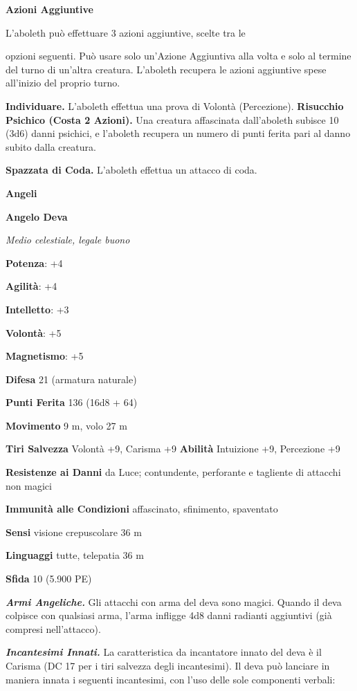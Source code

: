 \begin{multicols}{2}
\textbf{Azioni Aggiuntive}

L'aboleth può effettuare 3 azioni aggiuntive, scelte tra le

opzioni seguenti. Può usare solo un'Azione Aggiuntiva alla volta e
solo al termine del turno di un'altra creatura. L'aboleth recupera le
azioni aggiuntive spese all'inizio del proprio turno.

\textbf{Individuare.} L'aboleth effettua una prova di Volontà
(Percezione). \textbf{Risucchio Psichico (Costa 2 Azioni).} Una creatura
affascinata dall'aboleth subisce 10 (3d6) danni psichici, e l'aboleth
recupera un numero di punti ferita pari al danno subito dalla creatura.

\textbf{Spazzata di Coda.} L'aboleth effettua un attacco di coda.



\textbf{Angeli}

\textbf{Angelo Deva}

\emph{Medio celestiale, legale buono}

\textbf{Potenza}: +4

\textbf{Agilità}: +4

\textbf{Intelletto}: +3

\textbf{Volontà}: +5

\textbf{Magnetismo}: +5

\textbf{Difesa} 21 (armatura naturale)

\textbf{Punti Ferita} 136 (16d8 + 64)

\textbf{Movimento} 9 m, volo 27 m

\textbf{Tiri Salvezza} Volontà +9, Carisma +9 \textbf{Abilità}
Intuizione +9, Percezione +9

\textbf{Resistenze ai Danni} da Luce; contundente, perforante e
tagliente di attacchi non magici

\textbf{Immunità alle Condizioni} affascinato, sfinimento, spaventato

\textbf{Sensi} visione crepuscolare 36 m

\textbf{Linguaggi} tutte, telepatia 36 m

\textbf{Sfida} 10 (5.900 PE)

\emph{\textbf{Armi Angeliche.}} Gli attacchi con arma del deva sono
magici. Quando il deva colpisce con qualsiasi arma, l'arma infligge 4d8
danni radianti aggiuntivi (già compresi nell'attacco).

\emph{\textbf{Incantesimi Innati.}} La caratteristica da incantatore
innato del deva è il Carisma (DC 17 per i tiri salvezza degli
incantesimi). Il deva può lanciare in maniera innata i seguenti
incantesimi, con l'uso delle sole componenti verbali:


\end{multicols}
